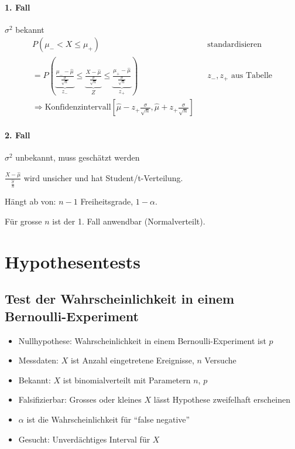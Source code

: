 \documentclass[10pt,a4paper]{scrartcl}
\begin{document}
\paragraph{1. Fall} $\sigma^2$ bekannt
\begin{align*}
  P(\mu_{-} < X \le \mu_{+}) &&\text{standardisieren} \\
  = P(\underbrace{\frac{\mu_{-} -\hat{\mu}}{\frac{\sigma}{\sqrt{n}}}}_{z_{-}} \le 
      \underbrace{\frac{X -\hat{\mu}}{\frac{\sigma}{\sqrt{n}}}}_{Z} \le 
      \underbrace{\frac{\mu_{+} -\hat{\mu}}{\frac{\sigma}{\sqrt{n}}}}_{z_{+}}) && z_-, z_+ \text{ aus Tabelle} \\
      \Rightarrow \text{Konfidenzintervall} \left[\hat{\mu}-z_+ \frac{\sigma}{\sqrt{n}}, \hat{\mu} + z_+ \frac{\sigma}{\sqrt{n}}\right]
\end{align*}

\paragraph{2. Fall} $\sigma^2$ unbekannt, muss geschätzt werden

$\frac{X - \hat{\mu}}{\hat{\frac{\sigma}{n}}}$ wird unsicher und hat Student/t-Verteilung.

Hängt ab von: $n-1$ Freiheitsgrade, $1-\alpha$.

Für grosse $n$ ist der 1. Fall anwendbar (Normalverteilt).

\section{Hypothesentests}
\subsection{Test der Wahrscheinlichkeit in einem Bernoulli-Experiment}

\begin{itemize}
\item Nullhypothese: Wahrscheinlichkeit in einem Bernoulli-Experiment ist $p$
\item Messdaten: $X$ ist Anzahl eingetretene Ereignisse, $n$ Versuche
\item Bekannt: $X$ ist binomialverteilt mit Parametern $n$, $p$
\item Falsifizierbar: Grosses oder kleines $X$ lässt Hypothese zweifelhaft erscheinen
\item $\alpha$ ist die Wahrscheinlichkeit für ``false negative''
\item Gesucht: Unverdächtiges Interval für $X$
\end{itemize}
\end{document}
